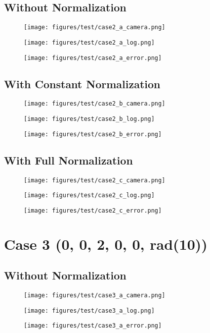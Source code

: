 \subsection{Without Normalization}
\begin{figure}[ht!] \centering \texttt{[image: figures/test/case2\_a\_camera.png]} \end{figure}
\begin{figure}[ht!] \centering \texttt{[image: figures/test/case2\_a\_log.png]} \end{figure}
\begin{figure}[ht!] \centering \texttt{[image: figures/test/case2\_a\_error.png]} \end{figure}
\clearpage
\subsection{With Constant Normalization}
\begin{figure}[ht!] \centering \texttt{[image: figures/test/case2\_b\_camera.png]} \end{figure}
\begin{figure}[ht!] \centering \texttt{[image: figures/test/case2\_b\_log.png]} \end{figure}
\begin{figure}[ht!] \centering \texttt{[image: figures/test/case2\_b\_error.png]} \end{figure}
\clearpage
\subsection{With Full Normalization}
\begin{figure}[ht!] \centering \texttt{[image: figures/test/case2\_c\_camera.png]} \end{figure}
\begin{figure}[ht!] \centering \texttt{[image: figures/test/case2\_c\_log.png]} \end{figure}
\begin{figure}[ht!] \centering \texttt{[image: figures/test/case2\_c\_error.png]} \end{figure}
\clearpage

\section{Case 3 (0, 0, 2, 0, 0, rad(10))}
\subsection{Without Normalization}
\begin{figure}[ht!] \centering \texttt{[image: figures/test/case3\_a\_camera.png]} \end{figure}
\begin{figure}[ht!] \centering \texttt{[image: figures/test/case3\_a\_log.png]} \end{figure}
\begin{figure}[ht!] \centering \texttt{[image: figures/test/case3\_a\_error.png]} \end{figure}
\clearpage
